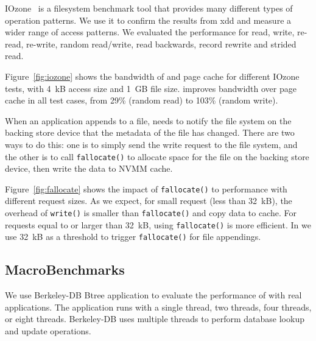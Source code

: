 IOzone~\cite{iozone} is a filesystem benchmark tool that provides many different types of 
operation patterns. We use it to confirm the results from xdd and measure a wider range of access patterns.  We evaluated the performance for read, write,
re-read, re-write, random read/write, read backwards, record rewrite and
strided read.

Figure~\ref{fig:iozone} shows the bandwidth of \CChell{} and page cache
for different IOzone tests, with 4~kB access size and 1~GB file size.
\CChell{} improves bandwidth over page cache in all test cases,
from 29\% (random read) to 103\% (random write).


When an application appends to a file, \CChell{} needs to notify the file system
on the backing store device that the metadata of the file has changed. There
are two ways to do this: one is to simply send the write request to the file
system, and the other is to call \texttt{fallocate()} to allocate space for
the file on the backing store device, then write the data to NVMM cache.


Figure~\ref{fig:fallocate} shows the impact of \texttt{fallocate()}
to \CChell{} performance with different request sizes. As we expect, for small
request (less than 32~kB), the overhead of \texttt{write()} is smaller than 
\texttt{fallocate()} and copy data to cache.  For requests equal to or larger
than 32~kB, using \texttt{fallocate()} is more efficient.  In \CChell{} we use
32~kB as a threshold to trigger \texttt{fallocate()} for file appendings.



\subsection{MacroBenchmarks}
\label{sec:macrobenchmark}

We use Berkeley-DB Btree application to evaluate the performance of
\CChell{} with real applications.
The application runs with a
single thread, two threads, four threads, or eight threads. Berkeley-DB
uses multiple threads to perform database lookup and update operations.

